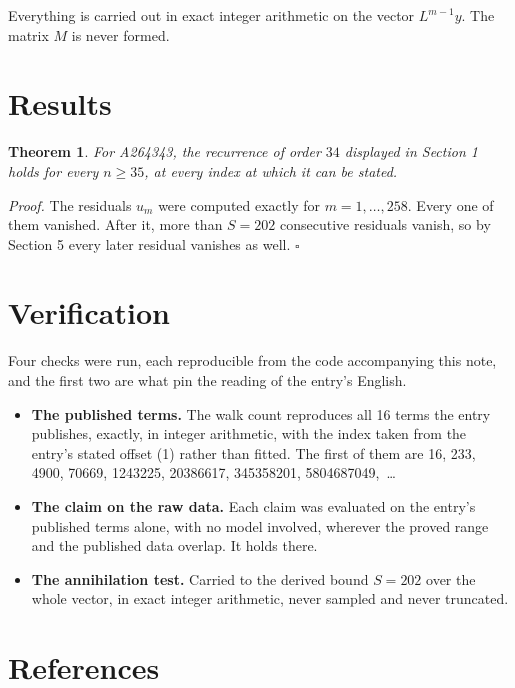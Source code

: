 \documentclass[11pt]{article}
\newtheorem{theorem}{Theorem}
\theoremstyle{definition}
\begin{document}
Everything is carried out in exact integer arithmetic on the vector $L^{m-1}y$. The matrix $M$ is never formed.

\section{Results}

\begin{theorem} For A264343, the recurrence of order $34$ displayed in Section 1 holds for every $n \ge 35$, at every index at which it can be stated.\end{theorem}

{\itshape Proof.} The residuals $u_m$ were computed exactly for $m = 1,\dots,258$. Every one of them vanished. After it, more than $S = 202$ consecutive residuals vanish, so by Section 5 every later residual vanishes as well. $\square$

\section{Verification}

Four checks were run, each reproducible from the code accompanying this note, and the first two are what pin the reading of the entry's English.

\begin{itemize}

\item {\bfseries The published terms.} The walk count reproduces all 16 terms the entry publishes, exactly, in integer arithmetic, with the index taken from the entry's stated offset (1) rather than fitted. The first of them are 16, 233, 4900, 70669, 1243225, 20386617, 345358201, 5804687049,~\dots

\item {\bfseries The claim on the raw data.} Each claim was evaluated on the entry's published terms alone, with no model involved, wherever the proved range and the published data overlap. It holds there.

\item {\bfseries The annihilation test.} Carried to the derived bound $S = 202$ over the whole vector, in exact integer arithmetic, never sampled and never truncated.

\end{itemize}

\section{References}
\end{document}
